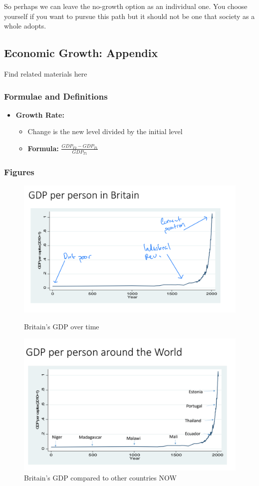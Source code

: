 \documentclass[12pt, letterpaper]{article}
\begin{document}
So perhaps we can leave the no-growth option as an individual one. You choose yourself if you want to pursue this path but it should not be one that society as a whole adopts.

\subsection{Economic Growth: Appendix}
Find related materials here 
\subsubsection{Formulae and Definitions}
\begin{itemize}
	\item \textbf{Growth Rate:}
		\begin{itemize}
			\item Change is the new level divided by the initial level
			\item \textbf{Formula:} $\frac{GDP_{T2} - GDP_{T1}}{GDP_{T1}}$
		\end{itemize}
\end{itemize}

\subsubsection{Figures}

\begin{figure}[h]
\centering
	\begin{minipage}{0.45\textwidth}
		\centering
		\includegraphics[width=.7\textwidth]{britain_gdp_1}
		\caption{Britain's GDP over time}
		\label{fig:britain_gdp_1}
	\end{minipage}\hfill
	\begin{minipage}{0.45\textwidth}
		\centering
		\includegraphics[width=.7\textwidth]{britain_gdp_2}
		\caption{Britain's GDP compared to other countries NOW}
		\label{fig:britain_gdp_2}
	\end{minipage}
\end{figure}	
	
\end{document}
